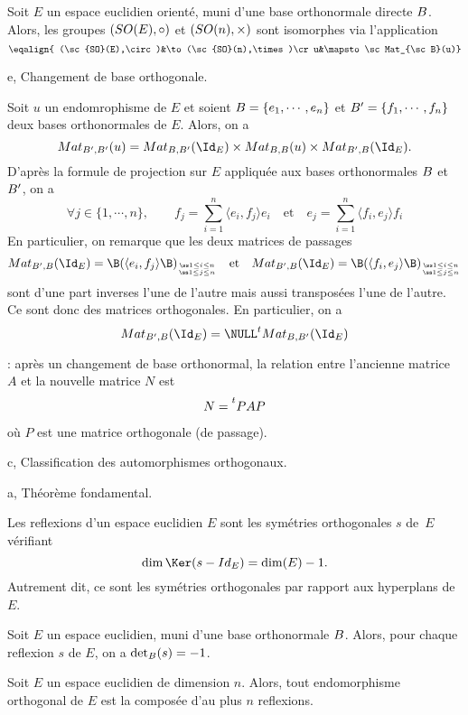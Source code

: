 \Propriete []  Soit $E$ un espace euclidien orienté, muni d'une base orthonormale directe $\sc B$. Alors, les groupes $(\sc{SO}(E),\circ)$ et $(\sc{SO}(n),\times)$ sont isomorphes via l'application 
$$
\eqalign{ (\sc{SO}(E),\circ)&\to(\sc{SO}(n),\times)\cr  u&\mapsto \sc Mat_{\sc B}(u)}
$$

\Subsection e, Changement de base orthogonale.


\Propriete[Title=Changement de base orthonormale]
Soit $u$ un endomrophisme de $E$ et soient $\sc B=\{e_1,\cdots,e_n\}$ et $\sc B'=\{f_1,\cdots,f_n\}$ deux bases orthonormales de $E$. 
Alors, on a 
$$
\sc Mat_{\sc B',\sc B'}(u)=\sc Mat_{\sc B,\sc B'}(\Id_E)\times\sc Mat_{\sc B,\sc B}(u)\times\sc Mat_{\sc B',\sc B}(\Id_E).
$$
D'après la formule de projection sur $E$ appliquée aux bases orthonormales $\sc B$ et $\sc B'$, on a 
$$
\forall j\in\{1,\cdots,n\}, \qquad f_j=\sum_{i=1}^n\langle e_i,f_j\rangle e_i\quad\mbox{et}\quad e_j=\sum_{i=1}^n\langle f_i,e_j\rangle f_i
$$
En particulier, on remarque que les deux matrices de passages 
$$
\sc Mat_{\sc B',\sc B}(\Id_E)=\B(\langle e_i,f_j\rangle\B)_{\ss1\le i\le n\atop\ss1\le j\le n}\quad \mbox{et}\quad \sc Mat_{\sc B',\sc B}(\Id_E)=\B(\langle f_i,e_j\rangle\B)_{\ss1\le i\le n\atop\ss1\le j\le n}
$$
sont d'une part inverses l'une de l'autre mais aussi transposées l'une de l'autre. Ce sont donc des matrices orthogonales. En particulier, on a 
$$
\sc Mat_{\sc B',\sc B}(\Id_E)=\NULL^t\sc Mat_{\sc B,\sc B'}(\Id_E)
$$

\Remarque : après un changement de base orthonormal, la relation entre l'ancienne matrice $A$ et la nouvelle matrice $N$ est $$
N=\strut^tPAP
$$ 
où $P$ est une matrice orthogonale (de passage). 
\bigskip

\Section c, Classification des automorphismes orthogonaux. 

\Subsection a, Théorème fondamental. 

\Definition []  Les reflexions d'un espace euclidien $E$ sont les symétries orthogonales $s$ de~$E$ vérifiant 
$$
\dim\Ker(s-Id_E)=\dim(E)-1.
$$ 
Autrement dit, ce sont les symétries orthogonales par rapport aux hyperplans de $E$. 
\bigskip

\Propriete []  Soit $E$ un espace euclidien, muni d'une base orthonormale $\sc B$. Alors, pour chaque reflexion $s$ de $E$, on a $\det_{\sc B}(s)=-1$. 
\bigskip

\Theoreme []  Soit $E$ un espace euclidien de dimension $n$. Alors, tout endomorphisme orthogonal de $E$ est la composée d'au plus $n$ reflexions. 
\bigskip

